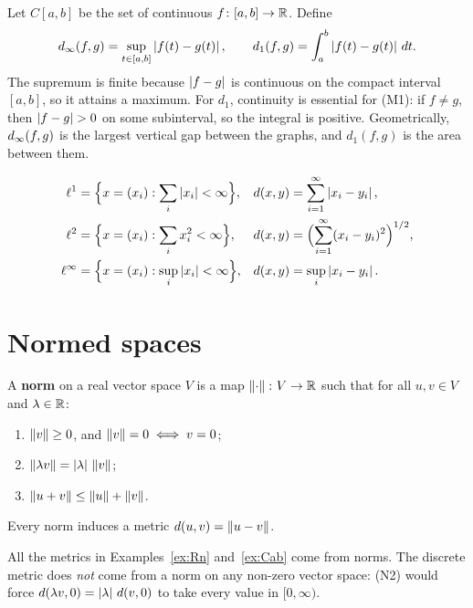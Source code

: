 \begin{example}\label{ex:Cab}
Let $C[a,b]$ be the set of continuous $f\colon[a,b]\to\mathbb{R}$. Define
\[
  d_\infty(f,g)=\sup_{t\in[a,b]}\left\lvert f(t)-g(t)\right\rvert,
  \qquad
  d_1(f,g)=\int_a^b\left\lvert f(t)-g(t)\right\rvert\,dt .
\]
The supremum is finite because $\left\lvert f-g\right\rvert$ is continuous on the compact interval $[a,b]$, so it attains a maximum. For $d_1$, continuity is essential for \textup{(M1)}: if $f\ne g$, then $\left\lvert f-g\right\rvert>0$ on some subinterval, so the integral is positive. Geometrically, $d_\infty(f,g)$ is the largest vertical gap between the graphs, and $d_1(f,g)$ is the area between them.
\end{example}

\begin{example}
\begin{align*}
  \ell^1 &= \Bigl\{x=(x_i): \sum_i\left\lvert x_i\right\rvert<\infty\Bigr\}, & d(x,y)&=\sum_{i=1}^\infty\left\lvert x_i-y_i\right\rvert,\\
  \ell^2 &= \Bigl\{x=(x_i): \sum_i x_i^2<\infty\Bigr\}, & d(x,y)&=\Bigl(\sum_{i=1}^\infty(x_i-y_i)^2\Bigr)^{1/2},\\
  \ell^\infty &= \Bigl\{x=(x_i): \sup_i\left\lvert x_i\right\rvert<\infty\Bigr\}, & d(x,y)&=\sup_{i}\left\lvert x_i-y_i\right\rvert.
\end{align*}
\end{example}

\section{Normed spaces}
\begin{definition}[Norm]\label{def:norm}
A \textbf{norm} on a real vector space $V$ is a map $\left\lVert \cdot\right\rVert\colon V\to\mathbb{R}$ such that for all $u,v\in V$ and $\lambda\in\mathbb{R}$:
\begin{enumerate}[label=\textbf{(N\arabic*)},leftmargin=3.2em]
  \item $\left\lVert v\right\rVert\ge0$, and $\left\lVert v\right\rVert=0\iff v=0$;
  \item $\left\lVert \lambda v\right\rVert=\left\lvert \lambda\right\rvert\,\left\lVert v\right\rVert$;
  \item $\left\lVert u+v\right\rVert\le\left\lVert u\right\rVert+\left\lVert v\right\rVert$.
\end{enumerate}
Every norm induces a metric $d(u,v)=\left\lVert u-v\right\rVert$.
\end{definition}

\begin{remark}
All the metrics in Examples~\ref{ex:Rn} and~\ref{ex:Cab} come from norms. The discrete metric does \emph{not} come from a norm on any non-zero vector space: \textup{(N2)} would force $d(\lambda v,0)=\left\lvert \lambda\right\rvert\,d(v,0)$ to take every value in $[0,\infty)$.
\end{remark}

